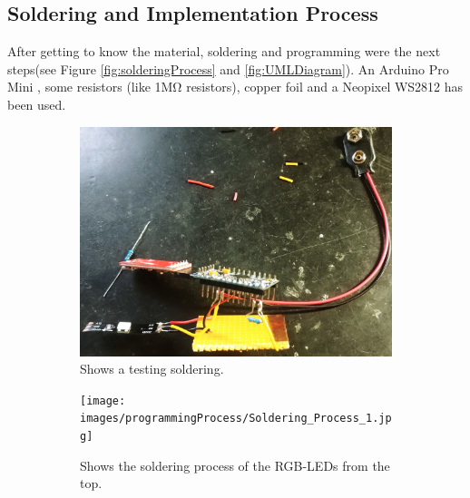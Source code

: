 \documentclass[04_projectProcess.tex]{subfiles}
\begin{document}
    \subsection{Soldering and Implementation Process}
    \begin{flushleft}
        After getting to know the material, soldering and programming were the next steps(see Figure \ref{fig:solderingProcess} and \ref{fig:UMLDiagram}).
        An Arduino Pro Mini \cite{arduinoProMini}, some resistors (like 
        1M\si{\ohm} resistors), copper foil and a Neopixel WS2812 has been used. \\      
        
        \begin{figure}[H]
            \centering
            \begin{subfigure}{.45\textwidth}
                \centering
                \includegraphics[width=0.8\linewidth]{images/programmingProcess/solderingProcess.jpg}
                \caption{Shows a testing soldering.}
                \label{fig:solderingProcess_0}
                \vspace{6mm}
            \end{subfigure}
            \begin{subfigure}{.45\textwidth}
                \centering
                \texttt{[image: images/programmingProcess/Soldering\_Process\_1.jpg]}
                \caption{Shows the soldering process of the RGB-LEDs from the top.}
                \label{fig:solderingProcess_1}
                \vspace{6mm}
            \end{subfigure}
            \hspace{1mm}
            \begin{subfigure}{.45\textwidth}
                \centering

\end{subfigure}
\end{figure}
\end{flushleft}
\end{document}
